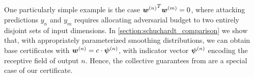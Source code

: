 \documentclass{article} %
\theoremstyle{plain}
\theoremstyle{definition}
\theoremstyle{remark}
\begin{document}
One particularly simple example is the case ${{\bm{w}}^{(n)}}^T {{\bm{w}}^{(m)}} = 0$, where attacking predictions $y_n$ and $y_m$ requires allocating adversarial budget to two entirely disjoint sets of input dimensions.
In \autoref{section:schuchardt_comparison} we show that, with appropriately parameterized smoothing distributions, we can obtain base certificates with ${\bm{w}}^{(n)} = c \cdot {\bm{\psi}}^{(n)}$, with indicator vector ${\bm{\psi}}^{(n)}$ encoding the receptive field of output $n$.
Hence, the collective guarantees from \citep{Schuchardt2021} are a special case of our certificate.
\end{document}
